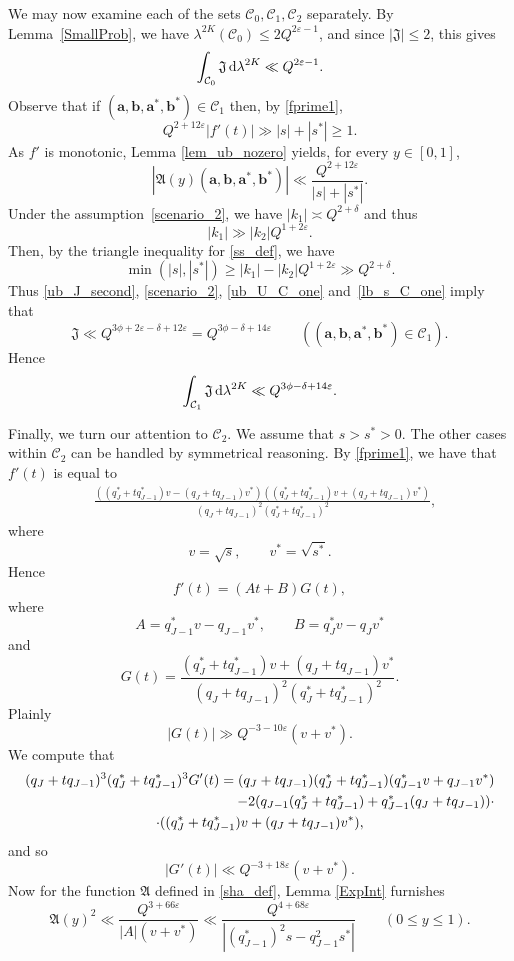 \documentclass[12pt, reqno]{amsart}
\theoremstyle{definition}
\theoremstyle{remark}
\numberwithin{equation}{section}
\def\del{{\delta}} \def\Del{{\Delta}}
\def\lam{{\lambda}} \def\Lam{{\Lambda}} \def\Lamtil{{\widetilde \Lambda}}
\def\eps{\varepsilon}
\def\le{\leqslant} \def\ge{\geqslant}
\def\ls{\leqslant} \def\gs{\geqslant}
\def\d{{\,{\rm d}}}
\def \ba {\mathbf a}
\def \bb {\mathbf b}
\def \fA {\mathfrak A}
\def \fJ {\mathfrak J}
\def \cC {\mathcal C}
\begin{document}
We may now examine each of the sets $\cC_0, \cC_1, \cC_2$ separately.  By Lemma~\ref{SmallProb}, we have $\lam^{2K}(\cC_0) \le 2Q^{2\eps-1}$, and since $|\fJ| \le 2$, this gives
\begin{equation}
\label{Contribution220}
\int_{\cC_0} \fJ \d \lam^{2K} \ll Q^{2\eps - 1}.
\end{equation}
Observe that if $(\ba,\bb,\ba^*,\bb^*) \in \cC_1$ then, by \eqref{fprime1},
\[ Q^{2+12\eps} |f'(t)| \gg |s| + |s^*| \ge 1. \]
As $f'$ is monotonic, Lemma \ref{lem_ub_nozero} yields, for every $y\in[0,1]$,
\begin{equation} \label{ub_U_C_one}
|\fA(y)(\ba,\bb,\ba^*,\bb^*)| \ll \frac{Q^{2+12\eps}} {|s|+|s^*|}.
\end{equation}
Under the assumption~\eqref{scenario_2}, we have $|k_1|\asymp Q^{2+\delta}$ and thus
\[
|k_1| \gg  |k_2| Q^{1 + 2 \eps}.
\]
Then, by the triangle inequality for \eqref{ss_def}, we have
\begin{equation} \label{lb_s_C_one}
\min\left(|s|, |s^*|\right) \ge |k_1| - |k_2| Q^{1+2\eps} \gg Q^{2+\del}.
\end{equation}
Thus \eqref{ub_J_second}, \eqref{scenario_2}, \eqref{ub_U_C_one} and~\eqref{lb_s_C_one} imply that 
\[
\fJ \ll Q^{3\phi+2\varepsilon-\delta+12\varepsilon}
=Q^{3\phi-\delta+14\varepsilon}
\qquad 
((\ba,\bb,\ba^*,\bb^*) \in \cC_1).
\]
Hence
\begin{equation} 
\label{Contribution221}
\int_{\cC_1} \fJ \d \lam^{2K} \ll Q^{3\phi-\delta+14\varepsilon}.
\end{equation}

\bigskip

Finally, we turn our attention to $\cC_2$. We assume that $s > s^* > 0$. The other cases within $\cC_2$ can be handled by symmetrical reasoning. By \eqref{fprime1}, we have that $f'(t)$ is equal to 
\begin{align*}
&  \frac{((q_J^* + tq_{J-1}^*)v - (q_J + tq_{J-1}) v^*) ((q_J^* + tq_{J-1}^*)v + (q_J + tq_{J-1}) v^*)}{(q_J + tq_{J-1})^2 (q_J^* + tq_{J-1}^*)^2},
\end{align*}
where 
\[
v = \sqrt s, \qquad v^* = \sqrt{s^*}.
\]
Hence
\[
f'(t) = (At + B) G(t),
\]
where
\[
A = q_{J-1}^*v - q_{J-1}v^*, \qquad
B = q_J^* v - q_J v^*
\]
and
\[
G(t) = \frac{(q_J^* + tq_{J-1}^*)v + (q_J + tq_{J-1}) v^*}{(q_J + tq_{J-1})^2 (q_J^* + tq_{J-1}^*)^2}.
\]
Plainly $$|G(t)| \gg Q^{- 3-10\varepsilon} (v+v^*).$$ 
We compute that 
\begin{multline*}
(q_J + tq_{J-1})^3 (q_J^* + tq_{J-1}^*)^3 G'(t)  =  (q_J + tq_{J-1}) (q_J^* + tq_{J-1}^*) (q_{J-1}^*v + q_{J-1} v^*)  \\
\hfill -2(q_{J-1}(q_J^* + tq_{J-1}^*) + q_{J-1}^* (q_J + tq_{J-1})) \cdot \\
\cdot ((q_J^* + tq_{J-1}^*)v + (q_J + tq_{J-1})v^*),
\end{multline*}
and so $$|G'(t)| \ll Q^{ - 3 + 18\eps}(v+v^*).$$ Now for the function $\fA$ defined in \eqref{sha_def},  Lemma \ref{ExpInt} furnishes
\begin{equation} \label{bound_case_one}
\fA(y)^2 \ll \frac{Q^{3+66\eps}} {|A| (v+v^*)} \ll  \frac{Q^{4+68\eps}}{|(q_{J-1}^*)^2 s - q_{J-1}^2 s^*|}   \qquad (0\ls y \ls 1). 
\end{equation}
\end{document}

